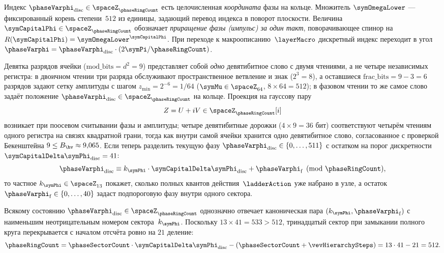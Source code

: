 \begin{remark}
\label{rem:phi-omega-Phi}
Индекс $\phaseVarphi_{\mathrm{disc}}\in\spaceZ_{\phaseRingCount}$ есть целочисленная \emph{координата} фазы на кольце.
Множитель $\symOmegaLower$ --- фиксированный корень степени~$512$ из единицы, задающий перевод индекса в поворот плоскости.
Величина $\symCapitalPhi\in\spaceZ_{\phaseRingCount}$ обозначает \emph{приращение фазы (импульс) за один такт}, поворачивающее спинор на $R(\symCapitalPhi)=\symOmegaLower^{\symCapitalPhi}$.
При переходе к макроописанию~$\layerMacro$ дискретный индекс переходит в угол $\phaseVarphi = \phaseVarphi_{\mathrm{disc}}\cdot(2\symPi/\phaseRingCount)$.
\end{remark}

Девятка разрядов ячейки ($\mathrm{mod\_bits} = d^2 = 9$) представляет собой \emph{одно} девятибитное слово с двумя чтениями, а не четыре независимых регистра: в двоичном чтении три разряда обслуживают пространственное ветвление и знак ($2^3=8$), а оставшиеся $\mathrm{frac\_bits} = 9 - 3 = 6$ разрядов задают сетку амплитуды с шагом $z_{\min} = 2^{-6} = 1/64$ ($\symMu\in\spaceZ_{64}$, $8\times 64 = 512$); в фазовом чтении то же самое слово задаёт положение $\phaseVarphi_{\mathrm{disc}}\in\spaceZ_{\phaseRingCount}$ на кольце.
Проекция на гауссову пару
\[
  Z = U + iV \in \spaceZ_{\phaseRingCount}[i]
\]
возникает при поосевом считывании фазы и амплитуды; четыре девятибитные дорожки ($4\times 9 = 36$ бит) соответствуют четырём чтениям одного регистра на связях квадратной грани, тогда как внутри самой ячейки хранится одно девятибитное слово, согласованное с проверкой Бекенштейна $9 \le B_{\hv}\approx 9{,}065$.
Если теперь разделить текущую фазу $\phaseVarphi_{\mathrm{disc}}\in\{0,\ldots,511\}$ с остатком на порог дискретности $\symCapitalDelta\symPhi_{\mathrm{disc}} = 41$:
\[
  \phaseVarphi_{\mathrm{disc}} \equiv k_{\symPhi}\cdot\symCapitalDelta\symPhi_{\mathrm{disc}} + \phaseVarphi_{\mathrm{f}}
  \pmod{\phaseRingCount},
\]
то частное $k_{\symPhi}\in\spaceZ_{13}$ покажет, сколько полных квантов действия~$\ladderAction$ уже набрано в узле, а остаток $\phaseVarphi_{\mathrm{f}}\in\{0,\ldots,40\}$ задаст подпороговую фазу внутри одного сектора.

\begin{proposition}
\label{prop:canonical-phase}
Всякому состоянию $\phaseVarphi_{\mathrm{disc}}\in\spaceZ_{\phaseRingCount}$ однозначно отвечает каноническая пара $(k_{\symPhi},\phaseVarphi_{\mathrm{f}})$ с наименьшим неотрицательным номером сектора~$k_{\symPhi}$.
Поскольку $13\times 41 = 533 > 512$, тринадцатый сектор при замыкании полного круга перекрывается с началом отсчёта ровно на $21$ деление:
\[
  \phaseRingCount = \phaseSectorCount\cdot\symCapitalDelta\symPhi_{\mathrm{disc}} - (\phaseSectorCount + \vevHierarchySteps) = 13\cdot 41 - 21 = 512.
\]
\end{proposition}

